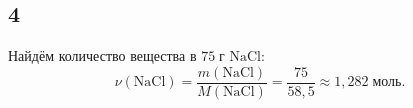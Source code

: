 \subsection{4}
Найдём количество вещества в $75\;\text{г}$ $\mathrm{NaCl}$:
\[
\nu(\mathrm{NaCl})=\frac{m(\mathrm{NaCl})}{M(\mathrm{NaCl})}=\frac{75}{58{,}5}\approx1{,}282\;\text{моль}.
\]